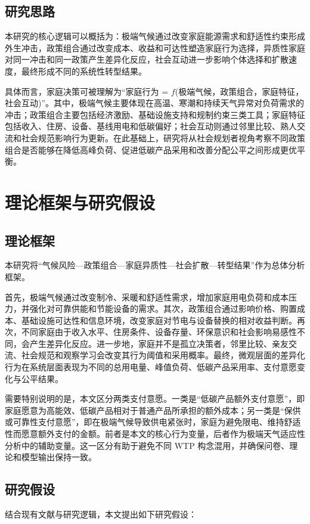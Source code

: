 \documentclass[12pt,a4paper]{ctexart}
\begin{document}
\subsection{研究思路}
本研究的核心逻辑可以概括为：极端气候通过改变家庭能源需求和舒适性约束形成外生冲击，政策组合通过改变成本、收益和可达性塑造家庭行为选择，异质性家庭对同一冲击和同一政策产生差异化反应，社会互动进一步影响个体选择和扩散速度，最终形成不同的系统性转型结果。

具体而言，家庭决策可被理解为“家庭行为 = $f$(极端气候，政策组合，家庭特征，社会互动)”。其中，极端气候主要体现在高温、寒潮和持续天气异常对负荷需求的冲击；政策组合主要包括经济激励、基础设施支持和规制约束三类工具；家庭特征包括收入、住房、设备、基线用电和低碳偏好；社会互动则通过邻里比较、熟人交流和社会规范影响行为更新。在此基础上，研究将从社会规划者视角考察不同政策组合是否能够在降低高峰负荷、促进低碳产品采用和改善分配公平之间形成更优平衡。

\section{理论框架与研究假设}
\subsection{理论框架}
本研究将“气候风险—政策组合—家庭异质性—社会扩散—转型结果”作为总体分析框架。

首先，极端气候通过改变制冷、采暖和舒适性需求，增加家庭用电负荷和成本压力，并强化对可靠供能和节能设备的需求。其次，政策组合通过影响价格、购置成本、基础设施可达性和信息环境，改变家庭对节电与设备替换的相对收益判断。再次，不同家庭由于收入水平、住房条件、设备存量、环保意识和社会影响易感性不同，会产生差异化反应。进一步地，家庭并不是孤立决策者，邻里比较、亲友交流、社会规范和观察学习会改变其行为阈值和采用概率。最终，微观层面的差异化行为在系统层面表现为不同的总用电量、峰值负荷、低碳产品采用率、支付意愿变化与公平结果。

需要特别说明的是，本文区分两类支付意愿。一类是“低碳产品额外支付意愿”，即家庭愿意为高能效、低碳产品相对于普通产品所承担的额外成本；另一类是“保供或可靠性支付意愿”，即在极端气候导致供电紧张时，家庭为避免限电、维持舒适性而愿意额外支付的金额。前者是本文的核心行为变量，后者作为极端天气适应性分析中的辅助变量。这一区分有助于避免不同 WTP 构念混用，并确保问卷、理论和模型输出保持一致。

\subsection{研究假设}
结合现有文献与研究逻辑，本文提出如下研究假设：
\end{document}
